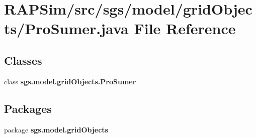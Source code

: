 \section{R\-A\-P\-Sim/src/sgs/model/grid\-Objects/\-Pro\-Sumer.java File Reference}
\label{_pro_sumer_8java}
\subsection*{Classes}
\begin{DoxyCompactItemize}
\item 
class {\bf sgs.\-model.\-grid\-Objects.\-Pro\-Sumer}
\end{DoxyCompactItemize}
\subsection*{Packages}
\begin{DoxyCompactItemize}
\item 
package {\bf sgs.\-model.\-grid\-Objects}
\end{DoxyCompactItemize}
